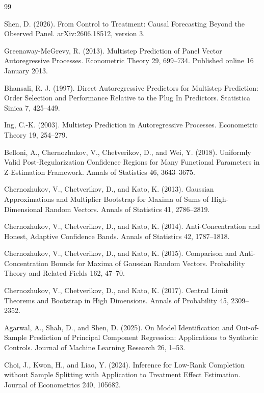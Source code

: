 \documentclass{article}
\begin{document}
\begin{thebibliography}{99}

   Shen, D. (2026). From Control to Treatment: Causal Forecasting Beyond the Observed Panel. arXiv:2606.18512, version 3.

   Greenaway-McGrevy, R. (2013). Multistep Prediction of Panel Vector Autoregressive Processes. Econometric Theory 29, 699--734. Published online 16 January 2013.

   Bhansali, R. J. (1997). Direct Autoregressive Predictors for Multistep Prediction: Order Selection and Performance Relative to the Plug In Predictors. Statistica Sinica 7, 425--449.

   Ing, C.-K. (2003). Multistep Prediction in Autoregressive Processes. Econometric Theory 19, 254--279.

   Belloni, A., Chernozhukov, V., Chetverikov, D., and Wei, Y. (2018). Uniformly Valid Post-Regularization Confidence Regions for Many Functional Parameters in Z-Estimation Framework. Annals of Statistics 46, 3643--3675.

   Chernozhukov, V., Chetverikov, D., and Kato, K. (2013). Gaussian Approximations and Multiplier Bootstrap for Maxima of Sums of High-Dimensional Random Vectors. Annals of Statistics 41, 2786--2819.

   Chernozhukov, V., Chetverikov, D., and Kato, K. (2014). Anti-Concentration and Honest, Adaptive Confidence Bands. Annals of Statistics 42, 1787--1818.

   Chernozhukov, V., Chetverikov, D., and Kato, K. (2015). Comparison and Anti-Concentration Bounds for Maxima of Gaussian Random Vectors. Probability Theory and Related Fields 162, 47--70.

   Chernozhukov, V., Chetverikov, D., and Kato, K. (2017). Central Limit Theorems and Bootstrap in High Dimensions. Annals of Probability 45, 2309--2352.

   Agarwal, A., Shah, D., and Shen, D. (2025). On Model Identification and Out-of-Sample Prediction of Principal Component Regression: Applications to Synthetic Controls. Journal of Machine Learning Research 26, 1--53.

   Choi, J., Kwon, H., and Liao, Y. (2024). Inference for Low-Rank Completion without Sample Splitting with Application to Treatment Effect Estimation. Journal of Econometrics 240, 105682.


\end{thebibliography}
\end{document}

